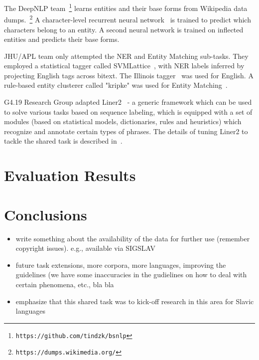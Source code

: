 \documentclass[11pt]{article}
\begin{document}
The {\sc DeepNLP} team~\footnote{\tt https://github.com/tindzk/bsnlp} learns entities and their base forms from 
Wikipedia data dumps.~\footnote{\tt https://dumps.wikimedia.org/} A character-level recurrent neural network~\cite{DBLP:conf/aaai/KimJSR16} 
is trained to predict which characters belong to an entity. A second neural network is trained on inflected entities and predicts their base forms.


JHU/APL team only attempted the NER and Entity Matching sub-tasks. They employed a statistical tagger called 
SVMLattice~\cite{Mayfield:2003:LTU:956863.956921}, with NER labels inferred by projecting English tags across bitext. 
The Illinois tagger~\cite{Ratinov:2009:DCM:1596374.1596399} was used for English. A rule-based entity clusterer 
called "kripke" was used for Entity Matching~\cite{DBLP:conf/tac/McNameeMFL13}.

{\sc G4.19 Research Group} adapted Liner2~\cite{series/sci/MarcinczukKJ13} - a generic framework 
which can be used to solve various tasks based on sequence labeling, which is equipped
with a set of modules (based on statistical models, dictionaries, rules and heuristics) 
which recognize and annotate certain types of phrases. The details of tuning Liner2 to
tackle the shared task is described in~\cite{marcinczuk:2017}.

\section{Evaluation Results}
\label{sec:results}


\section{Conclusions}
\label{sec:conclusions}


\begin{itemize}

\item write something about the availability of the data for further use (remember copyright issues). e.g.,
available via SIGSLAV 

\item future task extensions, more corpora, more languages, improving the guidelines (we have some inaccuracies
in the gudielines on how to deal with certain phenomena, etc., bla bla

\item emphasize that this shared task was to kick-off research in this area for Slavic languages

\end{itemize}
\end{document}
